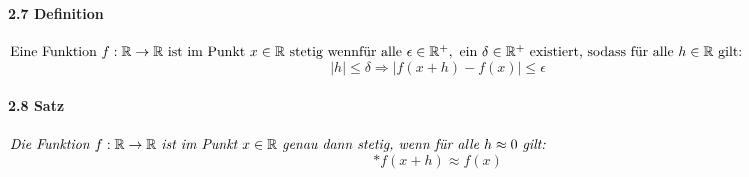 \documentclass[a4paper]{article}
\begin{document}
\paragraph{2.7 Definition} $ \text{Eine Funktion } f:\mathbb{R} \to \mathbb{R} \text{ ist im Punkt } x \in \mathbb{R} \text{ stetig wenn}\\
\text{für alle }\epsilon \in \mathbb{R}^+, \text{ ein } \delta  \in \mathbb{R}^+ \text{ existiert, sodass für alle } h \in \mathbb{R} \text{ gilt:}$
$$  |h| \leqslant \delta \Rightarrow |f(x + h) - f(x)| \leqslant \epsilon $$ 

\paragraph{2.8 Satz} $ \textit{Die Funktion } f:\mathbb{R} \to \mathbb{R} \textit{ ist im Punkt } x \in \mathbb{R} \textit{ genau dann stetig,}
\textit{ wenn für alle }\\ h \approx 0 \textit{ gilt:} $
$$ \text{*}f(x + h) \approx f(x) $$ 
\end{document}
